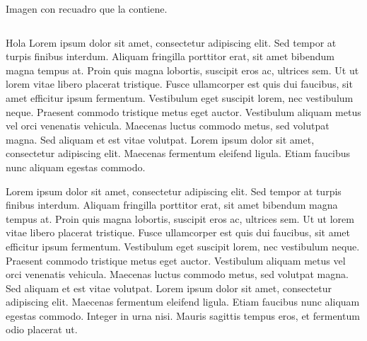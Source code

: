 \begin{frame}
    \vspace*{5mm}
    \begin{columns}
    
        Imagen con recuadro que la contiene.
    
    \end{columns}
\end{frame}


\begin{frame}{Hola}
    Lorem ipsum dolor sit amet, consectetur adipiscing elit. Sed tempor at turpis finibus interdum. Aliquam fringilla porttitor erat, sit amet bibendum magna tempus at. Proin quis magna lobortis, suscipit eros ac, ultrices sem. Ut ut lorem vitae libero placerat tristique. Fusce ullamcorper est quis dui faucibus, sit amet efficitur ipsum fermentum. Vestibulum eget suscipit lorem, nec vestibulum neque. Praesent commodo tristique metus eget auctor. Vestibulum aliquam metus vel orci venenatis vehicula. Maecenas luctus commodo metus, sed volutpat magna. Sed aliquam et est vitae volutpat. Lorem ipsum dolor sit amet, consectetur adipiscing elit. Maecenas fermentum eleifend ligula. Etiam faucibus nunc aliquam egestas commodo. 
\end{frame}


\begin{frame}
    Lorem ipsum dolor sit amet, consectetur adipiscing elit. Sed tempor at turpis finibus interdum. Aliquam fringilla porttitor erat, sit amet bibendum magna tempus at. Proin quis magna lobortis, suscipit eros ac, ultrices sem. Ut ut lorem vitae libero placerat tristique. Fusce ullamcorper est quis dui faucibus, sit amet efficitur ipsum fermentum. Vestibulum eget suscipit lorem, nec vestibulum neque. Praesent commodo tristique metus eget auctor. Vestibulum aliquam metus vel orci venenatis vehicula. Maecenas luctus commodo metus, sed volutpat magna. Sed aliquam et est vitae volutpat. Lorem ipsum dolor sit amet, consectetur adipiscing elit. Maecenas fermentum eleifend ligula. Etiam faucibus nunc aliquam egestas commodo. Integer in urna nisi. Mauris sagittis tempus eros, et fermentum odio placerat ut. 
\end{frame}


